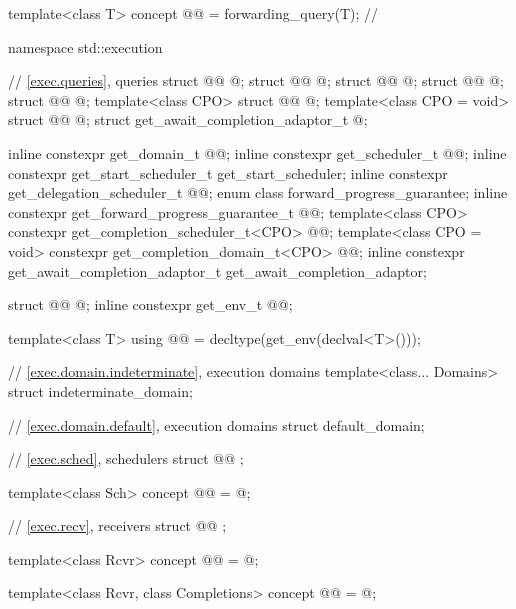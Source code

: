 \begin{codeblock}
{  template<class T>
    concept @@ = forwarding_query(T{});           // \expos
}

namespace std::execution {
  // \ref{exec.queries}, queries
  struct @@ { @\unspec@ };
  struct @@ { @\unspec@ };
  struct @@ { @\unspec@ };
  struct @@ { @\unspec@ };
  struct @@ { @\unspec@ };
  template<class CPO>
    struct @@ { @\unspec@ };
  template<class CPO = void>
    struct @@ { @\unspec@ };
  struct get_await_completion_adaptor_t { @\unspec@ };

  inline constexpr get_domain_t @@{};
  inline constexpr get_scheduler_t @@{};
  inline constexpr get_start_scheduler_t get_start_scheduler{};
  inline constexpr get_delegation_scheduler_t @@{};
  enum class forward_progress_guarantee;
  inline constexpr get_forward_progress_guarantee_t @@{};
  template<class CPO>
    constexpr get_completion_scheduler_t<CPO> @@{};
  template<class CPO = void>
    constexpr get_completion_domain_t<CPO> @@{};
  inline constexpr get_await_completion_adaptor_t get_await_completion_adaptor{};

  struct @@ { @\unspec@ };
  inline constexpr get_env_t @@{};

  template<class T>
    using @@ = decltype(get_env(declval<T>()));

  // \ref{exec.domain.indeterminate}, execution domains
  template<class... Domains>
    struct indeterminate_domain;

  // \ref{exec.domain.default}, execution domains
  struct default_domain;

  // \ref{exec.sched}, schedulers
  struct @@ {};

  template<class Sch>
    concept @@ = @\seebelow@;

  // \ref{exec.recv}, receivers
  struct @@ {};

  template<class Rcvr>
    concept @@ = @\seebelow@;

  template<class Rcvr, class Completions>
    concept @@ = @\seebelow@;

}
\end{codeblock}
